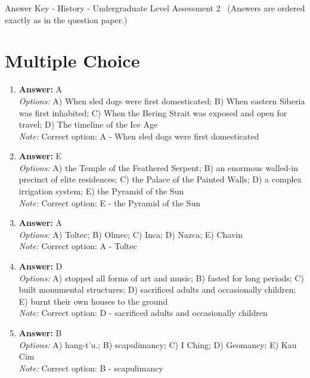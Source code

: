 \documentclass[12pt]{article}
\begin{document}
\begin{center}
Answer Key - History - Undergraduate Level Assessment 2 \
\small (Answers are ordered exactly as in the question paper.)
\end{center}

\section*{Multiple Choice}
\begin{enumerate}[label=\arabic*.]
\item \textbf{Answer:} A
\\ \textit{Options:} A) When sled dogs were first domesticated; B) When eastern Siberia was first inhabited; C) When the Bering Strait was exposed and open for travel; D) The timeline of the Ice Age
\\ \textit{Note:} Correct option: A - When sled dogs were first domesticated
\item \textbf{Answer:} E
\\ \textit{Options:} A) the Temple of the Feathered Serpent; B) an enormous walled-in precinct of elite residences; C) the Palace of the Painted Walls; D) a complex irrigation system; E) the Pyramid of the Sun
\\ \textit{Note:} Correct option: E - the Pyramid of the Sun
\item \textbf{Answer:} A
\\ \textit{Options:} A) Toltec; B) Olmec; C) Inca; D) Nazca; E) Chavin
\\ \textit{Note:} Correct option: A - Toltec
\item \textbf{Answer:} D
\\ \textit{Options:} A) stopped all forms of art and music; B) fasted for long periods; C) built monumental structures; D) sacrificed adults and occasionally children; E) burnt their own houses to the ground
\\ \textit{Note:} Correct option: D - sacrificed adults and occasionally children
\item \textbf{Answer:} B
\\ \textit{Options:} A) hang-t'u.; B) scapulimancy; C) I Ching; D) Geomancy; E) Kau Cim
\\ \textit{Note:} Correct option: B - scapulimancy
\end{enumerate}
\end{document}
